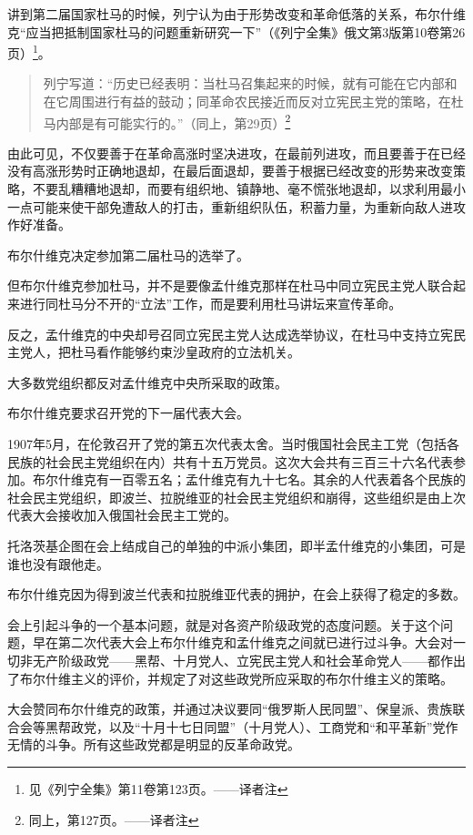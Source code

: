 讲到第二届国家杜马的时候，列宁认为由于形势改变和革命低落的关系，布尔什维克“应当把抵制国家杜马的问题重新研究一下”（《列宁全集》俄文第3版第10卷第26页）\footnote{见《列宁全集》第11卷第123页。——译者注}。

\begin{quotation}
列宁写道：“历史已经表明：当杜马召集起来的时候，就有可能在它内部和在它周围进行有益的鼓动；同革命农民接近而反对立宪民主党的策略，在杜马内部是有可能实行的。”（同上，第29页）\footnote{同上，第127页。——译者注}
\end{quotation}

由此可见，不仅要善于在革命高涨时坚决进攻，在最前列进攻，而且要善于在已经没有高涨形势时正确地退却，在最后面退却，要善于根据已经改变的形势来改变策略，不要乱糟糟地退却，而要有组织地、镇静地、毫不慌张地退却，以求利用最小一点可能来使干部免遭敌人的打击，重新组织队伍，积蓄力量，为重新向敌人进攻作好准备。

布尔什维克决定参加第二届杜马的选举了。

但布尔什维克参加杜马，并不是要像孟什维克那样在杜马中同立宪民主党人联合起来进行同杜马分不开的“立法”工作，而是要利用杜马讲坛来宣传革命。

反之，孟什维克的中央却号召同立宪民主党人达成选举协议，在杜马中支持立宪民主党人，把杜马看作能够约束沙皇政府的立法机关。

大多数党组织都反对孟什维克中央所采取的政策。

布尔什维克要求召开党的下一届代表大会。

1907年5月，在伦敦召开了党的第五次代表太舍。当时俄国社会民主工党（包括各民族的社会民主党组织在内）共有十五万党员。这次大会共有三百三十六名代表参加。布尔什维克有一百零五名；孟什维克有九十七名。其余的人代表着各个民族的社会民主党组织，即波兰、拉脱维亚的社会民主党组织和崩得，这些组织是由上次代表大会接收加入俄国社会民主工党的。

托洛茨基企图在会上结成自己的单独的中派小集团，即半孟什维克的小集团，可是谁也没有跟他走。

布尔什维克因为得到波兰代表和拉脱维亚代表的拥护，在会上获得了稳定的多数。

会上引起斗争的一个基本问题，就是对各资产阶级政党的态度问题。关于这个问题，早在第二次代表大会上布尔什维克和孟什维克之间就已进行过斗争。大会对一切非无产阶级政党——黑帮、十月党人、立宪民主党人和社会革命党人——都作出了布尔什维主义的评价，并规定了对这些政党所应采取的布尔什维主义的策略。

大会赞同布尔什维克的政策，并通过决议要同“俄罗斯人民同盟”、保皇派、贵族联合会等黑帮政党，以及“十月十七日同盟”（十月党人）、工商党和“和平革新”党作无情的斗争。所有这些政党都是明显的反革命政党。

